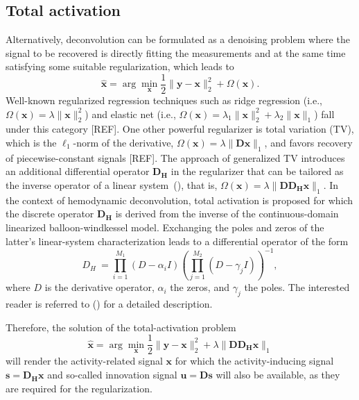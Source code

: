 
\subsection{Total activation}
Alternatively,  deconvolution can be formulated as a denoising problem where the signal to be recovered is directly fitting the measurements and at the same time satisfying some suitable regularization, which leads to
\begin{equation}
    \hat{\mathbf{x}} = \arg \min_{\mathbf{x}} \frac{1}{2} \| \mathbf{y} - \mathbf{x} \|_2^2 + \Omega(\mathbf{x}).
\end{equation}
Well-known regularized regression techniques such as ridge regression (i.e., $\Omega(\mathbf{x})=\lambda\|\mathbf{x}\|_2^2$) and elastic net (i.e., $\Omega(\mathbf{x})=\lambda_1\|\mathbf{x}\|_2^2 + \lambda_2\|\mathbf{x}\|_1$) fall under this category [REF]. One other powerful regularizer is total variation (TV), which is the $\ell_1$-norm of the derivative, $\Omega(\mathbf{x})=\lambda \|\mathbf{Dx}\|_1$, and favors recovery of piecewise-constant signals [REF]. The approach of generalized TV introduces an additional differential operator $\mathbf{D_H}$ in the regularizer that can be tailored as the inverse operator of a linear system~(\citealt{karahanoglu2011SignalProcessingApproacha}), that is, $\Omega(\mathbf{x})=\lambda \|\mathbf{D D_H x}\|_1$. In the context of hemodynamic deconvolution, total activation is proposed for which the discrete operator $\mathbf{D_H}$ is derived from the inverse of the continuous-domain linearized balloon-windkessel model. Exchanging the poles and zeros of the latter's linear-system characterization leads to a differential operator of the form 
\begin{equation}
    D_H\ = \prod_{i=1}^{M_1} (D-\alpha_i I) (\prod_{j=1}^{M_2} (D - \gamma_j I))^{-1},
\end{equation}
where \(D\) is the derivative operator, \(\alpha_i\) the zeros, and \(\gamma_j\) the poles. The interested reader is referred to (\citealt{karahanoglu2013TotalActivationFMRI}) for a detailed description. 

Therefore, the solution of the total-activation problem 
\begin{equation}
    \hat{\mathbf{x}} = \arg \min_{\mathbf{x}} \frac{1}{2} \| \mathbf{y} - \mathbf{x} \|_2^2 + \lambda \| \mathbf{D D_H x} \|_1
\end{equation}
will render the activity-related signal $\mathbf{x}$ for which the activity-inducing signal $\mathbf{s}=\mathbf{D_H x}$ and so-called innovation signal $\mathbf{u}=\mathbf{Ds}$ will also be available, as they are required for the regularization.  

